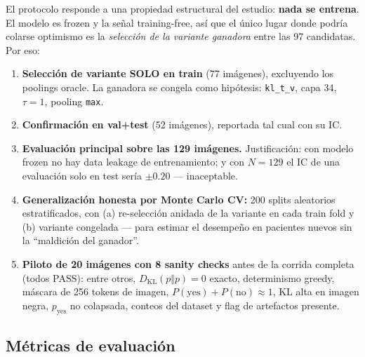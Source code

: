 \documentclass[12pt,a4paper]{article}
\newcommand{\KL}{D_{\mathrm{KL}}}
\begin{document}
El protocolo responde a una propiedad estructural del estudio: \textbf{nada
se entrena}. El modelo es frozen y la señal training-free, así que el único
lugar donde podría colarse optimismo es la \emph{selección de la variante
ganadora} entre las 97 candidatas. Por eso:

\begin{enumerate}[leftmargin=1.6em]
    \item \textbf{Selección de variante SOLO en train} (77 imágenes),
    excluyendo los poolings oracle. La ganadora se congela como hipótesis:
    \texttt{kl\_t\_v}, capa 34, $\tau = 1$, pooling \texttt{max}.
    \item \textbf{Confirmación en val+test} (52 imágenes), reportada tal
    cual con su IC.
    \item \textbf{Evaluación principal sobre las 129 imágenes.}
    Justificación: con modelo frozen no hay data leakage de entrenamiento;
    y con $N = 129$ el IC de una evaluación solo en test sería $\pm 0.20$
    --- inaceptable.
    \item \textbf{Generalización honesta por Monte Carlo CV:} 200 splits
    aleatorios estratificados, con (a) re-selección anidada de la variante
    en cada train fold y (b) variante congelada --- para estimar el
    desempeño en pacientes nuevos sin la ``maldición del ganador''.
    \item \textbf{Piloto de 20 imágenes con 8 sanity checks} antes de la
    corrida completa (todos PASS): entre otros, $\KL(p\Vert p) = 0$
    exacto, determinismo greedy, máscara de 256 tokens de imagen,
    $P(\mathrm{yes}) + P(\mathrm{no}) \approx 1$, KL alta en imagen negra,
    $p_{\mathrm{yes}}$ no colapsada, conteos del dataset y flag de
    artefactos presente.
\end{enumerate}

\subsection{Métricas de evaluación}
\label{sec:metricas}
\end{document}
